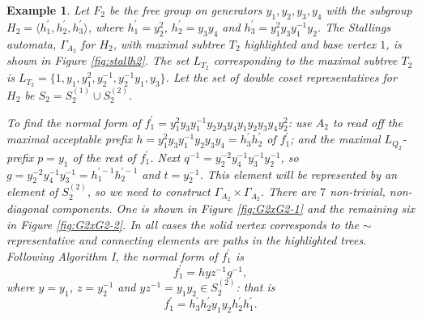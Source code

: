 \documentclass[a4paper,12pt]{article}
\newcommand{\G}{\Gamma }
\newtheorem{exam}[theorem]{Example}
\newenvironment{example}{\begin{exam} \rm}{\end{exam}}
\numberwithin{equation}{section}
\numberwithin{figure}{section}
\newcommand{\la}{\langle}
\newcommand{\ra}{\rangle}
\begin{document}
\begin{example}\label{ex:f_2}
Let $F_2$ be the free group on generators
$y_1,y_2,y_3,y_4$ with the subgroup $H_2 = \la h_1^{\prime},
h_2^{\prime},h_3^{\prime}\ra$, where
$h_1^{\prime}=y_2^2$,
$h_2^{\prime}=y_3y_4$ and
$h_3^{\prime}=y_1^2y_3y_1^{-1}y_2$.
The Stallings automata, $\G_{A_2}$ for $H_2$,
with maximal subtree $T_2$ highlighted and base vertex $1$, is shown
in Figure \ref{fig:stallh2}.
The set $L_{T_2}$ corresponding to the maximal subtree  $T_2$ is
 $L_{T_2}=
\{1, y_1, y_1^2,
y_2^{-1}, y_2^{-1}y_1, y_3 \}$.
Let the set of double coset representatives for $H_2$ be $S_2=S_2^{(1)}
\cup S_2^{(2)}$.

To find the normal form of $f_1^\prime=y_1^2y_3y_1^{-1}y_2y_3y_4y_1y_2
y_3y_4y_2^2$: use ${A_2}$ to read off the maximal acceptable
prefix $h= y_1^2y_3y_1^{-1}y_2y_3y_4=h_3^\prime h_2^\prime$ of $f_1^\prime$; and  the maximal
$L_{Q_2}$-prefix $p=y_1$ of the rest of $f_1^\prime$.  Next $q^{-1}=
y_2^{-2}y_4^{-1}y_3^{-1}y_2^{-1}$, so $g=y_2^{-2}y_4^{-1}y_3^{-1}
=h_1^{\prime -1}h_2^{\prime -1}$
and $t=y_2^{-1}$. This element will be represented by an element
of $S_2^{(2)}$, so we need to construct $\G_{A_2}\times \G_{A_2}$.
There are $7$  non-trivial, non-diagonal components. One is shown
in Figure \ref{fig:G2xG2-1} and the remaining
six in Figure \ref{fig:G2xG2-2}. In all cases the solid vertex
corresponds to the $\sim$ representative and connecting elements
are paths in the highlighted trees. Following Algorithm I, the
normal form of $f_1^\prime$ is
\[f_1^\prime=h yz^{-1} g^{-1},\]
where $y=y_1$, $z=y_2^{-1}$ and $yz^{-1}=y_1y_2\in S_2^{(2)}$: that is
\[f_1^\prime=h^\prime_3h_2^\prime y_1y_2 h_2^\prime h_1^\prime.\]
\end{example}
\end{document}
